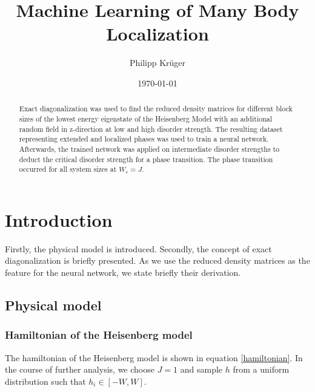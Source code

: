 \documentclass[reprint,amsmath,amssymb,aps,prb]{revtex4-2}
\begin{document}
%

\title{Machine Learning of Many Body Localization}

\author{Philipp Krüger}

\date{\today}%

\begin{abstract}
Exact diagonalization was used to find the reduced density matrices for different block sizes of the lowest energy eigenstate of the Heisenberg Model with an additional random field in z-direction at low and high disorder strength. The resulting dataset representing extended and localized phases was used to train a neural network. Afterwards, the trained network was applied on intermediate disorder strengths to deduct the critical disorder strength for a phase transition. The phase transition occurred for all system sizes at $W_c = J$. %
\end{abstract}

\maketitle

\section{Introduction}

Firstly, the physical model is introduced. Secondly, the concept of exact diagonalization is briefly presented. As we use the reduced density matrices as the feature for the neural network, we state briefly their derivation.
\subsection{Physical model}

\subsubsection{Hamiltonian of the Heisenberg model}

The hamiltonian of the Heisenberg model is shown in equation \ref{hamiltonian}. In the course of further analysis, we choose $J=1$ and sample $h$ from a uniform distribution such that $h_i \in \left[-W, W\right]$.
\end{document}
